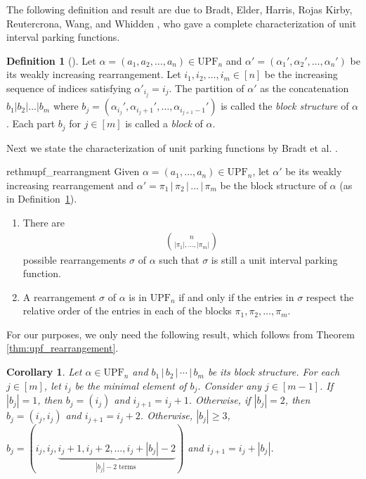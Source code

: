 \documentclass[11pt,reqno]{amsart}
\newtheorem{corollary}{Corollary}[section]
\theoremstyle{definition}
\newtheorem{definition}{Definition}[section]
\theoremstyle{notation}
\theoremstyle{openproblem}
\newcommand{\upf}[1]{\text{UPF}_{#1}}
\begin{document}
The following definition and result are due to Bradt, Elder, Harris, Rojas Kirby, Reutercrona, Wang, and Whidden \cite{unit_pf}, who gave a complete characterization of unit interval parking functions.

\begin{definition}[\cite{unit_pf}]
\label{def: block structure}
Let $\alpha = (a_1, a_2, \ldots, a_n) \in \upf{n}$ and $\alpha' = (\alpha_1', \alpha_2', \ldots, \alpha_n')$ be its weakly increasing rearrangement.
Let $i_1, i_2, \ldots, i_m \in [n]$ be the increasing sequence of indices satisfying $\alpha'_{i_j} = i_j$.
The partition of $\alpha'$ as the concatenation $b_1|b_2|\ldots|b_m$ where $b_j = (\alpha_{i_j}', \alpha_{i_j + 1}',\ldots, \alpha_{i_{j+1}-1}')$ is called the \textit{block structure} of $\alpha$. 
Each part $b_j$ for $j \in [m]$ is called a \emph{block} of $\alpha$.
\end{definition} 


Next we state the characterization of unit parking functions by Bradt et al. \cite[Theprem 2.9]{unit_pf}.

\begin{restatable}{rethm}{upf_rearrangment}\label{thm:upf_rearrangement}
Given $\alpha = (a_1, \ldots, a_n) \in \upf{n}$, let $\alpha'$ be its weakly increasing rearrangement and $\alpha'=\pi_1\,|\,\pi_2\,|\,\dots\,|\,\pi_m$ be the block structure of $\alpha$ (as in Definition~\ref{def: block structure}).
\begin{enumerate}
    \item  There are
\begin{align}
\binom{n}{|\pi_1|,\ldots, |\pi_m|}   \label{eq:rearrange count}
\end{align}
possible rearrangements $\sigma$ of $\alpha$ such that $\sigma$ is still a unit interval parking function.
\item A rearrangement $\sigma$ of $\alpha$ is in $\upf{n}$ if and only if the entries in $\sigma$ respect the relative order of the entries in each of the blocks $\pi_1,\pi_2,\ldots,\pi_m$.
\end{enumerate}
\end{restatable}

For our purposes, we only need the following result, which follows from Theorem \ref{thm:upf_rearrangement}. 

\begin{corollary}
\label{cor: block internals}
Let $\alpha \in \upf{n}$ and $b_1\,|\,b_2\,|\,\cdots\,|\,b_m$ be its block structure.
For each $j \in [m]$, let $i_j$ be the minimal element of $b_j$.
Consider any $j \in [m - 1]$.
If $|b_j| = 1$, then $b_j = (i_j)$ and $i_{j+1} = i_j + 1$.
Otherwise, if $|b_j| = 2$, then $b_j = (i_j, i_j)$ and $i_{j+1} = i_j + 2$.
Otherwise, $|b_j| \geq 3$, $b_j = (i_j, i_j, \underbrace{i_j + 1, i_j + 2, \ldots, i_j + |b_j| - 2}_{|b_j| - 2 \text{ terms }})$ and $i_{j+1} = i_j + |b_j|$.
\end{corollary}
\end{document}
